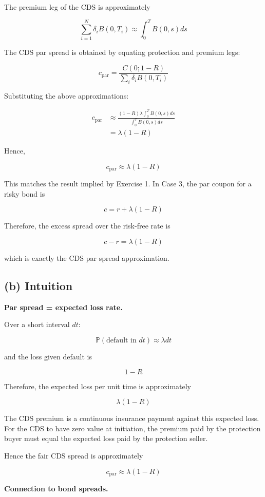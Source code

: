 \documentclass{article}
\begin{document}
The premium leg of the CDS is approximately

\[
\sum_{i=1}^N \delta_i B(0,T_i)
\approx
\int_0^T B(0,s)ds
\]

The CDS par spread is obtained by equating protection and premium legs:

\[
c_{\mathrm{par}}
=
\frac{C(0;1-R)}{\sum_i \delta_i B(0,T_i)}
\]

Substituting the above approximations:

\begin{align*}
c_{\mathrm{par}}
&\approx
\frac{(1-R)\lambda\int_0^T B(0,s)ds}
{\int_0^T B(0,s)ds} \\
&=
\lambda(1-R)
\end{align*}

Hence,

\[
\boxed{c_{\mathrm{par}} \approx \lambda(1-R)}
\]

This matches the result implied by Exercise 1. In Case 3, the par coupon for a risky bond is

\[
\boxed{c = r + \lambda(1-R)}
\]

Therefore, the excess spread over the risk-free rate is

\[
c-r = \lambda(1-R)
\]

which is exactly the CDS par spread approximation.

\subsection*{(b) Intuition}

\textbf{Par spread = expected loss rate.}

Over a short interval $dt$:

\[
\mathbb{P}(\text{default in }dt) \approx \lambda dt
\]

and the loss given default is

\[
1-R
\]

Therefore, the expected loss per unit time is approximately

\[
\lambda(1-R)
\]

The CDS premium is a continuous insurance payment against this expected loss. For the CDS to have zero value at initiation, the premium paid by the protection buyer must equal the expected loss paid by the protection seller.

Hence the fair CDS spread is approximately

\[
\boxed{c_{\mathrm{par}} \approx \lambda(1-R)}
\]

\textbf{Connection to bond spreads.}
\end{document}
